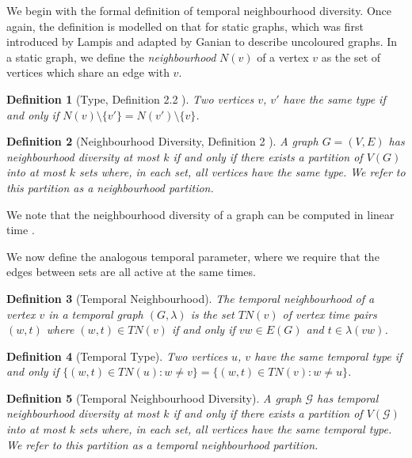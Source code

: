 \documentclass[preprint,12pt]{elsarticle}
\newtheorem{definition}{Definition}
\begin{document}
We begin with the formal definition of temporal neighbourhood diversity.  Once again, the definition is modelled on that for static graphs, which was first introduced by Lampis \cite{lampis_algorithmic_2012} and adapted by Ganian \cite{ganian_using_2012} to describe uncoloured graphs. In a static graph, we define the \emph{neighbourhood} $N(v)$ of a vertex $v$ as the set of vertices which share an edge with $v$. 
\begin{definition}[Type, Definition 2.2 \cite{ganian_using_2012}]
    Two vertices $v$, $v'$ have the same \emph{type} if and only if $N(v)\setminus\{v'\}=N(v')\setminus\{v\}$.
\end{definition}
\begin{definition}[Neighbourhood Diversity, Definition 2 \cite{lampis_algorithmic_2012}]
    A graph $G=(V,E)$ has \emph{neighbourhood diversity} at most $k$ if and only if there exists a partition of $V(G)$ into at most $k$ sets where, in each set, all vertices have the same type. We refer to this partition as a \emph{neighbourhood partition}.
\end{definition}

We note that the neighbourhood diversity of a graph can be computed in linear time \cite{lampis_algorithmic_2012}.

We now define the analogous temporal parameter, where we require that the edges between sets are all active at the same times.
\begin{definition}[Temporal Neighbourhood]
    The \emph{temporal neighbourhood} of a vertex $v$ in a temporal graph $(G, \lambda)$ is the set $TN(v)$ of vertex time pairs $(w, t)$ where $(w, t) \in TN(v)$ if and only if $vw \in E(G)$ and $t \in \lambda(vw)$.
\end{definition}

\begin{definition}[Temporal Type]
    Two vertices $u$, $v$ have the same \emph{temporal type} if and only if $\{(w,t) \in TN(u): w \neq v\} = \{(w,t) \in TN(v): w \neq u\}$. 
\end{definition}

\begin{definition}[Temporal Neighbourhood Diversity]
    A graph $\mathcal{G}$ has \emph{temporal neighbourhood diversity} at most $k$ if and only if there exists a partition of $V(\mathcal{G})$ into at most $k$ sets where, in each set, all vertices have the same temporal type. We refer to this partition as a \emph{temporal neighbourhood partition}. 
\end{definition}
\end{document}
